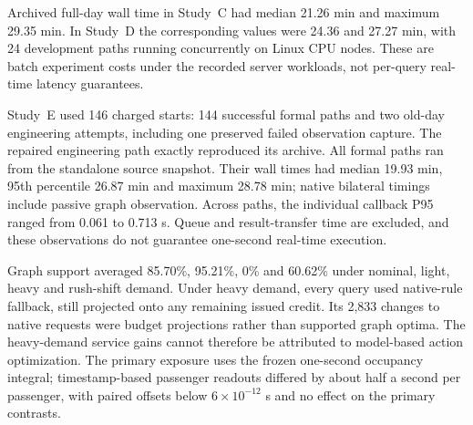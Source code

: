 Archived full-day wall time in Study~C had median 21.26 min and maximum 29.35 min. In Study~D the corresponding values were 24.36 and 27.27 min, with 24 development paths running concurrently on Linux CPU nodes. These are batch experiment costs under the recorded server workloads, not per-query real-time latency guarantees.

Study~E used 146 charged starts: 144 successful formal paths and two old-day engineering attempts, including one preserved failed observation capture. The repaired engineering path exactly reproduced its archive. All formal paths ran from the standalone source snapshot. Their wall times had median 19.93 min, 95th percentile 26.87 min and maximum 28.78 min; native bilateral timings include passive graph observation. Across paths, the individual callback P95 ranged from 0.061 to 0.713 s. Queue and result-transfer time are excluded, and these observations do not guarantee one-second real-time execution.

Graph support averaged 85.70\%, 95.21\%, 0\% and 60.62\% under nominal, light, heavy and rush-shift demand. Under heavy demand, every query used native-rule fallback, still projected onto any remaining issued credit. Its 2,833 changes to native requests were budget projections rather than supported graph optima. The heavy-demand service gains cannot therefore be attributed to model-based action optimization. The primary exposure uses the frozen one-second occupancy integral; timestamp-based passenger readouts differed by about half a second per passenger, with paired offsets below $6\times10^{-12}$ s and no effect on the primary contrasts.
